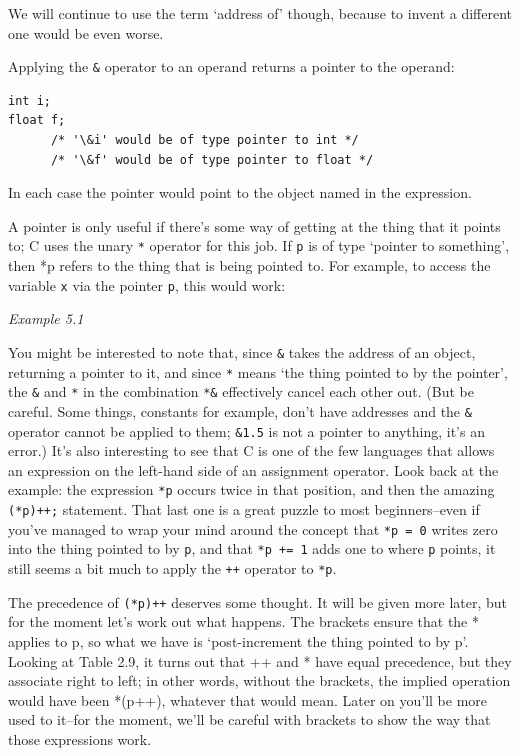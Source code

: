    We will continue to use the term `address of' though, because to
    invent a different one would be even worse.


   Applying the \texttt{\&} operator to an operand returns
    a pointer to the operand:


   \begin{Verbatim}
int i;
float f;
      /* '\&i' would be of type pointer to int */
      /* '\&f' would be of type pointer to float */
\end{Verbatim}

   In each case the pointer would point to the object named in the
    expression.


   A pointer is only useful if there's some way of getting at the thing
    that it points to; C uses the unary \texttt{*} operator for this
    job.  If \texttt{p} is of type `pointer to something', then *p
    refers to the thing that is being pointed to. For example, to access the
    variable \texttt{x} via the pointer \texttt{p}, this would
    work:


   \begin{center}\textit{Example 5.1}\end{center}


   You might be interested to note that, since \texttt{\&} takes
    the address of an object, returning a pointer to it, and since
    \texttt{*} means `the thing pointed to by the pointer', the
    \texttt{\&} and \texttt{*} in the combination
    \texttt{*\&} effectively cancel each other out. (But be careful.
    Some things, constants for example, don't have addresses and the
    \texttt{\&} operator cannot be applied to them;
    \texttt{\&1.5} is not a pointer to anything, it's an error.) It's
    also interesting to see that C is one of the few languages that allows
    an expression on the left-hand side of an assignment operator. Look back
    at the example: the expression \texttt{*p} occurs twice in that
    position, and then the amazing \texttt{(*p)++;} statement. That last
    one is a great puzzle to most beginners--even if you've managed to
    wrap your mind around the concept that \texttt{*p = 0} writes zero
    into the thing pointed to by \texttt{p}, and that \texttt{*p +=
    1} adds one to where \texttt{p} points, it still seems a bit
    much to apply the \texttt{++} operator to \texttt{*p}.


   The precedence of \texttt{(*p)++} deserves some thought. It will
    be given more later, but for the moment let's work out what happens. The
    brackets ensure that the * applies to p, so what we have is
    `post-increment the thing pointed to by p'. Looking at Table 2.9, it turns out that ++ and * have equal precedence, but they
    associate right to left; in other words, without the brackets, the
    implied operation would have been *(p++), whatever that would mean.
    Later on you'll be more used to it--for the moment, we'll be careful
    with brackets to show the way that those expressions work.


